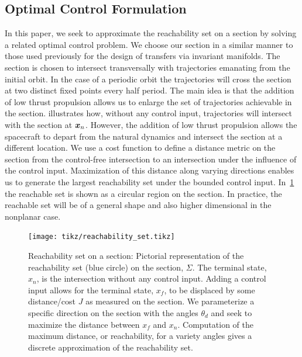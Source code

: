 \subsection{Optimal Control Formulation}\label{sec:optimal_control}
In this paper, we seek to approximate the reachability set on a \Poincare section by solving a related optimal control problem. 
We choose our \Poincare section in a similar manner to those used previously for the design of transfers via invariant manifolds.
The \Poincare section is chosen to intersect transversally with trajectories emanating from the initial orbit. 
In the case of a periodic orbit the trajectories will cross the \Poincare section at two distinct fixed points every half period.
The main idea is that the addition of low thrust propulsion allows us to enlarge the set of trajectories achievable in the \Poincare section. 
 illustrates how, without any control input, trajectories will intersect with the \Poincare section at \( \bm{x}_n \). 
However, the addition of low thrust propulsion allows the spacecraft to depart from the natural dynamics and intersect the \Poincare section at a different location.
We use a cost function to define a distance metric on the \Poincare section from the control-free intersection to an intersection under the influence of the control input.
Maximization of this distance along varying directions enables us to generate the largest reachability set under the bounded control input.
In~\cref{fig:reachability_set} the reachable set is shown as a circular region on the \Poincare section.
In practice, the reachable set will be of a general shape and also higher dimensional in the nonplanar case.
\begin{figure}
        \centering
        \texttt{[image: tikz/reachability\_set.tikz]}
        \caption{Reachability set on a \Poincare section: Pictorial representation of the reachability set (blue circle) on the \Poincare section, \(\Sigma\). 
            The terminal state, \( x_n\), is the intersection without any control input. 
            Adding a control input allows for the terminal state, \( x_f \), to be displaced by some distance/cost \( J \) as measured on the section.
            We parameterize a specific direction on the section with the angles \( \theta_d\) and seek to maximize the distance between \( x_f \) and \( x_n \).
            Computation of the maximum distance, or reachability, for a variety angles gives a discrete approximation of the reachability set.\label{fig:reachability_set}}
\end{figure}

